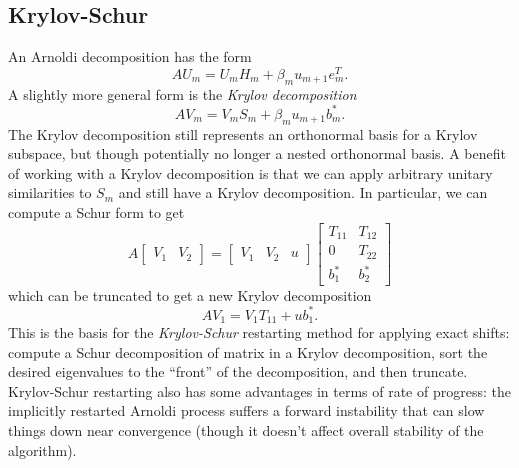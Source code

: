 \documentclass[12pt, leqno]{article} %
\begin{document}
\subsection{Krylov-Schur}

An Arnoldi decomposition has the form
\[
  A U_m = U_m H_m + \beta_m u_{m+1} e_m^T.
\]
A slightly more general form is the {\em Krylov decomposition}
\[
  A V_m = V_m S_m + \beta_m u_{m+1} b_m^*.
\]
The Krylov decomposition still represents an orthonormal basis for a
Krylov subspace, but though potentially no longer a nested orthonormal
basis.
A benefit of working with a Krylov decomposition is that we can apply
arbitrary unitary similarities to $S_m$ and still have a Krylov
decomposition.  In particular, we can compute a Schur form to get
\[
A \begin{bmatrix} V_1 & V_2 \end{bmatrix} =
\begin{bmatrix} V_1 & V_2 & u \end{bmatrix}
\begin{bmatrix} T_{11} & T_{12} \\ 0 & T_{22} \\ b_1^* & b_2^* \end{bmatrix}
\]
which can be truncated to get a new Krylov decomposition
\[
  A V_1 = V_1 T_{11} + u b_1^*.
\]
This is the basis for the {\em Krylov-Schur} restarting method for
applying exact shifts: compute a Schur decomposition of matrix in a
Krylov decomposition, sort the desired eigenvalues to the ``front'' of
the decomposition, and then truncate.  Krylov-Schur restarting also
has some advantages in terms of rate of progress: the implicitly
restarted Arnoldi process suffers a forward instability that can slow
things down near convergence (though it doesn't affect overall
stability of the algorithm).
\end{document}
